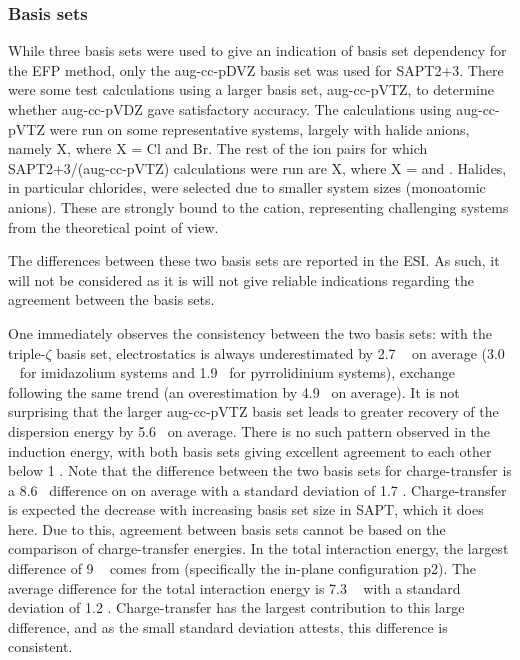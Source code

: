 \subsubsection{Basis sets}
While three basis sets were used to give an indication of basis set dependency for the EFP method, only the aug-cc-pDVZ basis set was used for SAPT2+3. 
There were some test calculations using a larger basis set, aug-cc-pVTZ, to determine whether aug-cc-pVDZ gave satisfactory accuracy.
The calculations using aug-cc-pVTZ were run on some representative systems, largely with halide anions, namely X, where X = Cl and Br.
The rest of the ion pairs for which SAPT2+3/(aug-cc-pVTZ) calculations were run are X, where X = \bfl and \cl.
Halides, in particular chlorides, were selected due to smaller system sizes (monoatomic anions). 
These are strongly bound to the cation, representing challenging systems from the theoretical point of view.
\cite{Lehmann2010a}


The differences between these two basis sets are reported in the ESI.
As such, it will not be considered as it is will not give reliable indications regarding the agreement between the basis sets.


One immediately observes the consistency between the two basis sets: with the triple-$\zeta$ basis set, electrostatics is always underestimated by 2.7 \enUnit~ on average (3.0 \enUnit~ for imidazolium systems and 1.9 \enUnit~for pyrrolidinium systems), exchange following the same trend (an overestimation by 4.9 \enUnit~on average).
It is not surprising that the larger aug-cc-pVTZ basis set leads to greater recovery of the dispersion energy by 5.6 \enUnit~on average.
There is no such pattern observed in the induction energy, with both basis sets giving excellent agreement to each other below 1 \enUnit.
Note that the difference between the two basis sets for charge-transfer is a 8.6 \enUnit~difference on on average with a standard deviation of 1.7 \enUnit.
Charge-transfer is expected the decrease with increasing basis set size in SAPT, which it does here. 
Due to this, agreement between basis sets cannot be based on the comparison of charge-transfer energies.
In the total interaction energy, the largest difference of 9 \enUnit~ comes from  (specifically the in-plane configuration p2).
The average difference for the total interaction energy is 7.3 \enUnit~ with a standard deviation of 1.2 \enUnit.
Charge-transfer has the largest contribution to this large difference, and as the small standard deviation attests, this difference is consistent.

